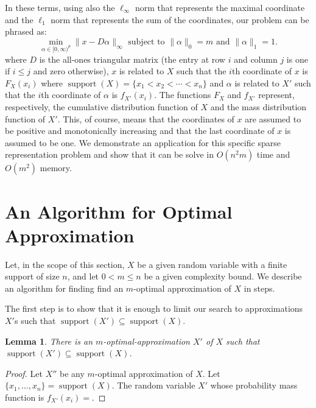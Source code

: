 \documentclass{article}
\newtheorem{lemma}[thm]{Lemma}
\DeclareMathOperator{\support}{support}
\begin{document}
In these terms, using also the $\ell_\infty$ norm that represents the maximal coordinate and the $\ell_1$ norm that represents the sum of the coordinates, our problem can be phrased as:
$$
\min_{\alpha \in [0,\infty)^p}\|x - D\alpha\|_{\infty} \text{ subject to }  \|\alpha\|_0 = m \text{ and } \|\alpha\|_1=1.
$$
where $D$ is the all-ones triangular matrix (the entry at row $i$ and column $j$ is one if $i\leq j$ and zero otherwise), $x$ is related to $X$ such that the $i$th coordinate of $x$ is $F_X(x_i)$ where $\support(X)=\{x_1 < x_2 < \cdots < x_n\}$ and $\alpha$ is related to $X'$ such that the $i$th coordinate of $\alpha$ is $f_{X'}(x_i)$. The functions $F_X$ and $f_{X'}$ represent, respectively, the cumulative distribution function of $X$ and the mass distribution function of $X'$. This, of course, means that the coordinates of $x$ are assumed to be positive and monotonically increasing and that the last coordinate of $x$ is assumed to be one. We demonstrate an application for this specific sparse representation problem and show that it can be solve in $O(n^2m)$ time and $O(m^2)$ memory.




\section{An Algorithm for Optimal Approximation}\label{sec:alg}
Let, in the scope of this section, $X$ be a given random variable with a finite support of size $n$, and let  $0<m\leq n$ be a given complexity bound. We describe an algorithm for finding find an $m$-optimal approximation of $X$ in steps.

The first step is to show that it is enough to limit our search to approximations $X'$s such that $\support(X') \subseteq \support(X)$.

\begin{lemma}\label{lem:supContained}
	There is an $m$-optimal-approximation $X'$ of $X$ such that $\support(X') \subseteq \support(X)$.
\end{lemma}
\begin{proof}
Let $X''$ be any $m$-optimal approximation of $X$.	Let $\{x_1,\dots,x_n\} = \support(X)$. The random variable $X'$ whose probability mass function is $f_{X'}(x_i)=$.

\end{proof}
\end{document}
